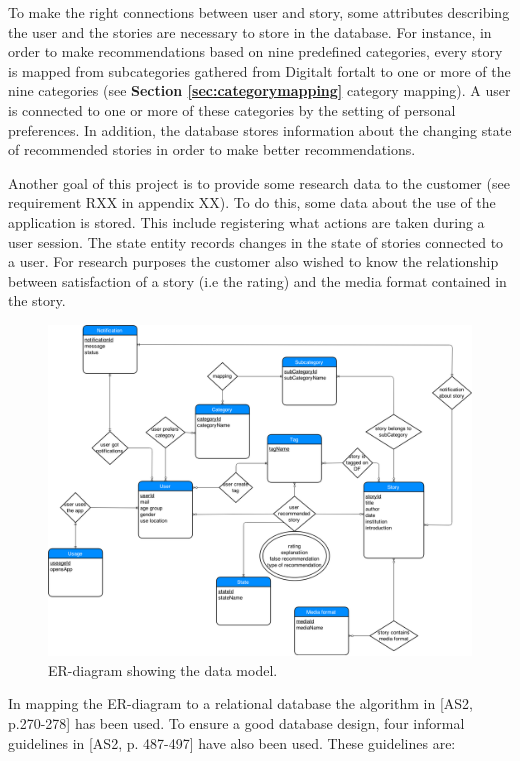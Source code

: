 To make the right connections between user and story, some attributes describing the user and the stories are necessary to store in the database. For instance, in order to make recommendations based on nine predefined categories, every story is mapped from subcategories gathered from Digitalt fortalt to one or more of the nine categories (see \textbf{Section \ref{sec:categorymapping}} category mapping). A user is connected to one or more of these categories by the setting of personal preferences. In addition, the database stores information about the changing state of recommended stories in order to make better recommendations. \newline

Another goal of this project is to provide some research data to the customer (see requirement RXX in appendix XX). To do this, some data about the use of the application is stored. This include registering what actions are taken during a user session. The state entity records changes in the state of stories connected to a user. For research purposes the customer also wished to know the relationship between satisfaction of a story (i.e the rating) and the media format contained in the story.

\begin{figure}[h!]
	\centering
	\includegraphics[width=\textwidth]{fig/er_diagram}
	\caption{ER-diagram showing the data model.}
	\label{Fig:er_diagram}
\end{figure}

In mapping the ER-diagram to a relational database the algorithm in [AS2, p.270-278] has been used. To ensure a good database design, four informal guidelines in [AS2, p. 487-497] have also been used. These guidelines are:

